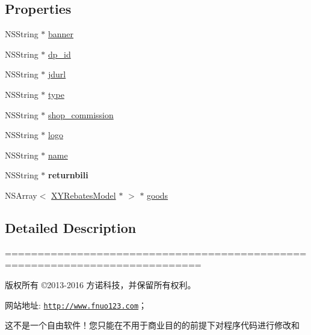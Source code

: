 \subsection*{Properties}
\begin{DoxyCompactItemize}
\item 
N\+S\+String $\ast$ \mbox{\hyperlink{interface_w_j_shop_list_model_ac2f776c3f58bbc94db8dd886e906cd38}{banner}}
\item 
N\+S\+String $\ast$ \mbox{\hyperlink{interface_w_j_shop_list_model_ac1eccea61679afee1aaaacb187987d9a}{dp\+\_\+id}}
\item 
N\+S\+String $\ast$ \mbox{\hyperlink{interface_w_j_shop_list_model_ad66d55d62f147b258061655a7d53bc9a}{jdurl}}
\item 
N\+S\+String $\ast$ \mbox{\hyperlink{interface_w_j_shop_list_model_a91824d04c31eacd410f558e37dde54ee}{type}}
\item 
N\+S\+String $\ast$ \mbox{\hyperlink{interface_w_j_shop_list_model_a8fda454c0f349b8d3cfb42c6ea58dd6c}{shop\+\_\+commission}}
\item 
N\+S\+String $\ast$ \mbox{\hyperlink{interface_w_j_shop_list_model_aadcd230a5d0c5f41e8b0a4e636801713}{logo}}
\item 
N\+S\+String $\ast$ \mbox{\hyperlink{interface_w_j_shop_list_model_ab4b4105cfaa55cdd895bb1f0e0265c5d}{name}}
\item 
\mbox{\label{interface_w_j_shop_list_model_a9a202c995dec4f34fade7401d665daa3}} 
N\+S\+String $\ast$ {\bfseries returnbili}
\item 
N\+S\+Array$<$ \mbox{\hyperlink{interface_x_y_rebates_model}{X\+Y\+Rebates\+Model}} $\ast$ $>$ $\ast$ \mbox{\hyperlink{interface_w_j_shop_list_model_a64dacfa31defe748eb7f814fad05c682}{goods}}
\end{DoxyCompactItemize}


\subsection{Detailed Description}
============================================================================

版权所有 ©2013-\/2016 方诺科技，并保留所有权利。

网站地址\+: \href{http://www.fnuo123.com}{\tt http\+://www.\+fnuo123.\+com}； 



这不是一个自由软件！您只能在不用于商业目的的前提下对程序代码进行修改和

